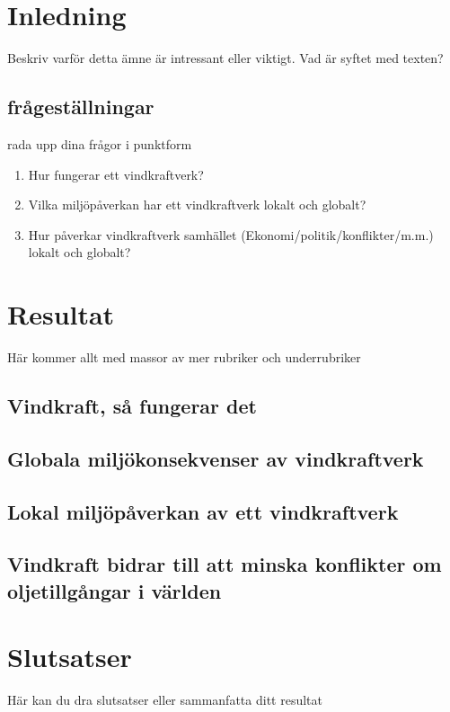 \documentclass[11p]{article}
\begin{document}
    \section{Inledning}
    Beskriv varför detta ämne är intressant eller viktigt. Vad är syftet med texten?
    \subsection{frågeställningar}
    rada upp dina frågor i punktform



    \begin{enumerate}
        \item Hur fungerar ett vindkraftverk?
        \item Vilka miljöpåverkan har ett vindkraftverk lokalt och globalt?
        \item Hur påverkar vindkraftverk samhället (Ekonomi/politik/konflikter/m.m.) lokalt och globalt?
    \end{enumerate}

    \section{Resultat}
    Här kommer allt med massor av mer rubriker och underrubriker
    \subsection{Vindkraft, så fungerar det}

    \subsection{Globala miljökonsekvenser av vindkraftverk}
    \subsection{Lokal miljöpåverkan av ett vindkraftverk}
    \subsection{Vindkraft bidrar till att minska konflikter om oljetillgångar i världen}
    \subsection{}

    \section{Slutsatser}
    Här kan du dra slutsatser eller sammanfatta ditt resultat
\end{document}
